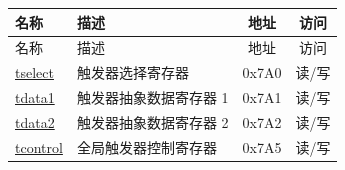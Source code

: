 
\begin{longtable}{ | p{4.0cm} | p{8.4cm} | c | c| }
\hline\rowcolor{lightgray}
名称 & 描述 & 地址 & 访问 \\ \hline
\endfirsthead
\hline
\rowcolor{lightgray}
名称 & 描述 & 地址 & 访问 \\ \hline
\endhead
\endfoot

\hyperref[regdesc:TSELECT]{tselect} & 触发器选择寄存器 & 0x7A0 & 读/写 \\\hline
\hyperref[regdesc:TDATA1]{tdata1} & 触发器抽象数据寄存器 1 & 0x7A1 & 读/写 \\\hline
\hyperref[regdesc:TDATA2]{tdata2} & 触发器抽象数据寄存器 2 & 0x7A2 & 读/写 \\\hline
\hyperref[regdesc:TCONTROL]{tcontrol} & 全局触发器控制寄存器 & 0x7A5 & 读/写 \\\hline

\end{longtable}
